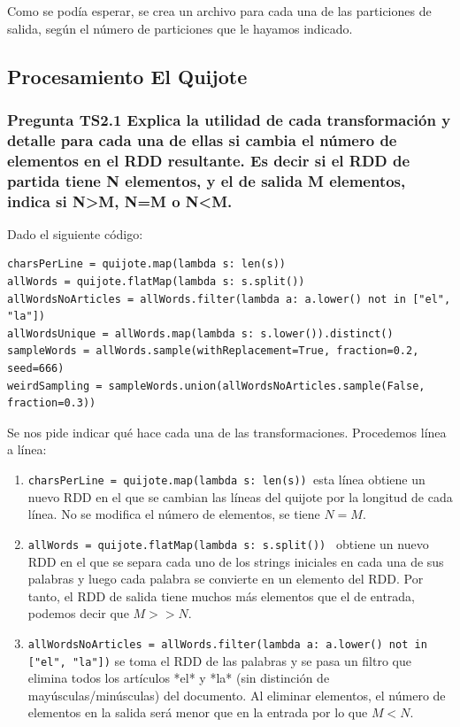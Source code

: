 \documentclass[11pt]{article}
\def\inline{\lstinline[basicstyle=\ttfamily,keywordstyle={}]}
\begin{document}
{{Como se podía esperar, se crea un archivo para cada una de las particiones de salida, según el número de particiones que le hayamos indicado.

\subsection{Procesamiento El Quijote}

\subsubsection*{ Pregunta TS2.1 Explica la utilidad de cada transformación y detalle para cada una de ellas si cambia el número de elementos en el RDD resultante. Es decir si el RDD de partida tiene N elementos, y el de salida M elementos, indica si N>M, N=M o N<M.}

Dado el siguiente código:
\begin{verbatim}
charsPerLine = quijote.map(lambda s: len(s))
allWords = quijote.flatMap(lambda s: s.split())
allWordsNoArticles = allWords.filter(lambda a: a.lower() not in ["el", "la"])
allWordsUnique = allWords.map(lambda s: s.lower()).distinct()
sampleWords = allWords.sample(withReplacement=True, fraction=0.2, seed=666)
weirdSampling = sampleWords.union(allWordsNoArticles.sample(False, fraction=0.3))
\end{verbatim}
Se nos pide indicar qué hace cada una de las transformaciones. Procedemos línea a línea:

\begin{enumerate}
\item  \inline{charsPerLine = quijote.map(lambda s: len(s)) }esta línea obtiene un nuevo RDD en el que se cambian las líneas del quijote por la longitud de cada línea. No se modifica el número de elementos, se tiene $N = M$.

\item  \inline{allWords = quijote.flatMap(lambda s: s.split()) } obtiene un nuevo RDD en el que se separa cada uno de los strings iniciales en cada una de sus palabras y luego cada palabra se convierte en un elemento del RDD. Por tanto, el RDD de salida tiene muchos más elementos que el de entrada, podemos decir que $M >> N$.

\item  \inline{allWordsNoArticles = allWords.filter(lambda a: a.lower() not in ["el", "la"])} se toma el RDD de las palabras y se pasa un filtro que elimina todos los artículos *el* y *la* (sin distinción de mayúsculas/minúsculas) del documento. Al eliminar elementos, el número de elementos en la salida será menor que en la entrada por lo que $M < N$.


\end{enumerate}}}
\end{document}
